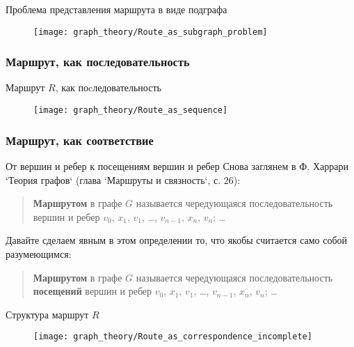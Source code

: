 \begin{frame}{Проблема представления маршрута в виде подграфа}
  \begin{figure}
    \centering
    \texttt{[image: graph\_theory/Route\_as\_subgraph\_problem]}
  \end{figure}
\end{frame}

\subsubsection{Маршрут, как последовательность}

\begin{frame}{Маршрут $R$, как поcледовательность}
  \begin{figure}
    \centering
    \texttt{[image: graph\_theory/Route\_as\_sequence]}
  \end{figure}
\end{frame}

\subsubsection{Маршрут, как соответствие}

\begin{frame}{От вершин и ребер к посещениям вершин и ребер}
  Снова заглянем в Ф. Харрари `Теория графов` (глава `Маршруты и связность`, с. 26):
  \begin{quote}
    \textbf{Маршрутом} в графе $G$ называется чередующаяся последовательность
    вершин и ребер $v_0$, $x_1$, $v_1$, \dots, $v_{n-1}$, $x_n$, $v_n$; \dots
  \end{quote}

  Давайте сделаем явным в этом определении то, что якобы считается
  само собой разумеющимся:
  \begin{quote}
    \textbf{Маршрутом} в графе $G$ называется чередующаяся последовательность \textbf{посещений}
    вершин и ребер $v_0$, $x_1$, $v_1$, \dots, $v_{n-1}$, $x_n$, $v_n$; \dots
  \end{quote}
\end{frame}

\begin{frame}{Структура маршрут $R$}
  \begin{figure}
    \centering
    \texttt{[image: graph\_theory/Route\_as\_correspondence\_incomplete]}
  \end{figure}
\end{frame}

